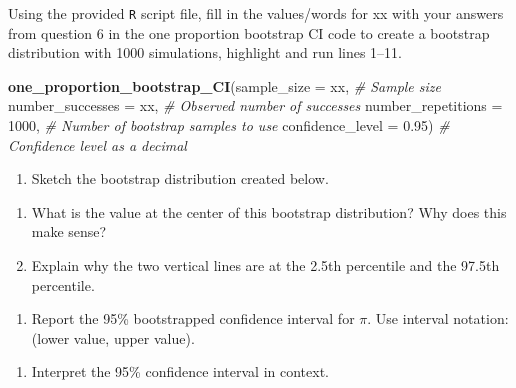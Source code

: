 \documentclass[
]{report}
\newenvironment{Shaded}{\begin{snugshade}}{\end{snugshade}}
\newcommand{\CommentTok}[1]{\textcolor[rgb]{0.56,0.35,0.01}{\textit{#1}}}
\newcommand{\DataTypeTok}[1]{\textcolor[rgb]{0.13,0.29,0.53}{#1}}
\newcommand{\DecValTok}[1]{\textcolor[rgb]{0.00,0.00,0.81}{#1}}
\newcommand{\FloatTok}[1]{\textcolor[rgb]{0.00,0.00,0.81}{#1}}
\newcommand{\KeywordTok}[1]{\textcolor[rgb]{0.13,0.29,0.53}{\textbf{#1}}}
\newcommand{\NormalTok}[1]{#1}
\providecommand{\tightlist}{%
  \setlength{\itemsep}{0pt}\setlength{\parskip}{0pt}}
\begin{document}
Using the provided \texttt{R} script file, fill in the values/words for xx with your answers from question 6 in the one proportion bootstrap CI code to create a bootstrap distribution with 1000 simulations, highlight and run lines 1--11.

\begin{Shaded}
\begin{Highlighting}[]
\KeywordTok{one\_proportion\_bootstrap\_CI}\NormalTok{(}\DataTypeTok{sample\_size =}\NormalTok{ xx, }\CommentTok{\# Sample size}
                    \DataTypeTok{number\_successes =}\NormalTok{ xx, }\CommentTok{\# Observed number of successes}
                    \DataTypeTok{number\_repetitions =} \DecValTok{1000}\NormalTok{, }\CommentTok{\# Number of bootstrap samples to use}
                    \DataTypeTok{confidence\_level =} \FloatTok{0.95}\NormalTok{) }\CommentTok{\# Confidence level as a decimal}
\end{Highlighting}
\end{Shaded}

\begin{enumerate}
\def\labelenumi{\arabic{enumi}.}
\setcounter{enumi}{6}
\tightlist
\item
  Sketch the bootstrap distribution created below.
\end{enumerate}

\vspace{1.8in}

\begin{enumerate}
\def\labelenumi{\arabic{enumi}.}
\setcounter{enumi}{7}
\item
  What is the value at the center of this bootstrap distribution? Why does this make sense?
  \vspace{.8in}
\item
  Explain why the two vertical lines are at the 2.5th percentile and the 97.5th percentile.
\end{enumerate}

\vspace{.8in}

\begin{enumerate}
\def\labelenumi{\arabic{enumi}.}
\setcounter{enumi}{9}
\tightlist
\item
  Report the 95\% bootstrapped confidence interval for \(\pi\). Use interval notation: (lower value, upper value).
\end{enumerate}

\vspace{0.3in}

\begin{enumerate}
\def\labelenumi{\arabic{enumi}.}
\setcounter{enumi}{10}
\tightlist
\item
  Interpret the 95\% confidence interval in context.
\end{enumerate}
\end{document}
